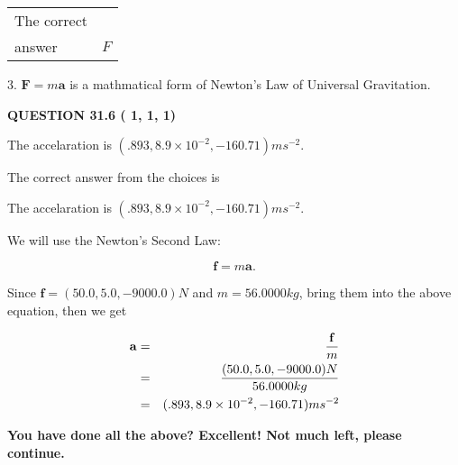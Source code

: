 \documentclass[12pt]{article}
\begin{document}
\noindent\begin{tabular}{|l|l|}\hline The correct & \\
          answer &  %
$F$ \\ \hline \end{tabular}
3.  %
$\mathbf{F}=m\mathbf{a}$ is a mathmatical form of  %
Newton's Law of Universal Gravitation.
 
 
 
  
\vspace{0.2in}
  
{\textbf{\Large{QUESTION
31.6 
 (          1,          1,          1)
}}}
  
  


 
 
\noindent{}
 
 
The accelaration is $  %
(
.893,
8.9 \times 10^{-2},
-160.71)
ms^{-2} $.
 
 
 
 
 
 
\noindent{}

The correct answer from the choices is


The accelaration is $  %
(
.893,
8.9 \times 10^{-2},
-160.71)
ms^{-2} $.
 
 
 
 
 
\noindent{}

We will use the Newton's Second Law:
 
\[
\mathbf{f}=m\mathbf{a}.
\]
 
Since $\mathbf{f}= %
(50.0 , 5.0 , -9000.0) N$
and $m= %
56.0000kg$, bring them into the above equation, then we get
 
\begin{eqnarray*}
\mathbf{a}&=&\frac{\mathbf{f}}m  \\
&=&\frac{ %
(50.0 , 5.0 , -9000.0) N}{ %
56.0000kg}  \\
&=& %
(.893 , 8.9 \times 10^{-2} , -160.71) ms^{-2}
\end{eqnarray*}
 
 
 
   
   
\vspace{0.3in}
{\textbf{\LARGE{You have done all the above? Excellent! Not much left, please continue.}}}
\vspace{0.3in}
   
\end{document}
